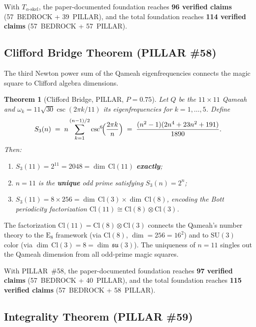 \documentclass[aps,prd,twocolumn,superscriptaddress,floatfix,nofootinbib]{revtex4-2}
\newtheorem{theorem}{Theorem}
\theoremstyle{definition}
\theoremstyle{remark}
\begin{document}
\noindent
With $T_{\alpha\text{-skel}}$, the paper-documented foundation reaches
\textbf{96 verified claims} (57~BEDROCK + 39~PILLAR), and the total foundation
reaches \textbf{114 verified claims} (57~BEDROCK + 57~PILLAR).

\subsection{Clifford Bridge Theorem (PILLAR \#58)}
\label{sec:clifford-bridge}

The third Newton power sum of the Qameah eigenfrequencies connects the magic
square to Clifford algebra dimensions.

\begin{theorem}[Clifford Bridge, PILLAR, $P{=}0.75$]
\label{thm:clifford-bridge}
Let $Q$ be the $11\times 11$ Qameah and $\omega_k = 11\sqrt{30}\csc(2\pi k/11)$
its eigenfrequencies for $k=1,\ldots,5$.  Define
\[
S_3(n) \;=\; n \sum_{k=1}^{(n-1)/2} \csc^6\!\Bigl(\frac{2\pi k}{n}\Bigr)
         \;=\; \frac{(n^2-1)(2n^4+23n^2+191)}{1890}.
\]
Then:
\begin{enumerate}
\item $S_3(11) = 2^{11} = 2048 = \dim\,\mathrm{Cl}(11)$ \textbf{exactly};
\item $n=11$ is the \textbf{unique} odd prime satisfying $S_3(n)=2^n$;
\item $S_3(11) = 8\times 256 = \dim\,\mathrm{Cl}(3)\times\dim\,\mathrm{Cl}(8)$,
      encoding the Bott periodicity factorization
      $\mathrm{Cl}(11)\cong\mathrm{Cl}(8)\otimes\mathrm{Cl}(3)$.
\end{enumerate}
\end{theorem}

The factorization $\mathrm{Cl}(11)=\mathrm{Cl}(8)\otimes\mathrm{Cl}(3)$ connects
the Qameah's number theory to the $\mathrm{E}_8$ framework (via $\mathrm{Cl}(8)$,
$\dim=256=16^2$) and to $\mathrm{SU}(3)$ color (via $\dim\,\mathrm{Cl}(3)=8=\dim\,\mathfrak{su}(3)$).
The uniqueness of $n=11$ singles out the Qameah dimension from all odd-prime magic
squares.

\noindent
With PILLAR~\#58, the paper-documented foundation reaches
\textbf{97 verified claims} (57~BEDROCK + 40~PILLAR), and the total foundation
reaches \textbf{115 verified claims} (57~BEDROCK + 58~PILLAR).

\subsection{Integrality Theorem (PILLAR \#59)}
\label{sec:integrality}
\end{document}
